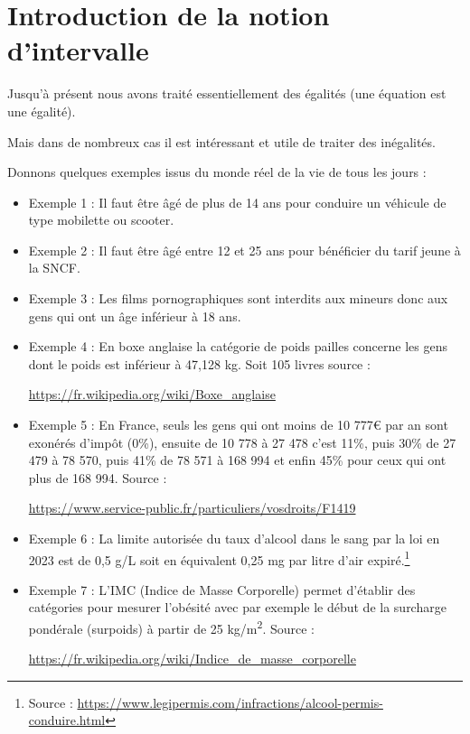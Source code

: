 \documentclass[a4paper,11pt]{book}
\begin{document}
\clearpage

\section{Introduction de la notion d'intervalle}
\label{sec:org36ae53c}
\label{orgac3c6cf}
\label{page:sec2.2.1intro-intervalle}



Jusqu'à présent nous avons traité essentiellement des égalités (une
équation est une égalité).

Mais dans de nombreux cas il est intéressant et utile de traiter des
inégalités.


Donnons quelques exemples issus du monde réel de la vie de tous les
jours :


\begin{itemize}
\item Exemple 1 : Il faut être âgé de plus de 14 ans pour conduire un
véhicule de type mobilette ou scooter.
\item Exemple 2 : Il faut être âgé entre 12 et 25 ans pour bénéficier du
tarif jeune à la SNCF.
\item Exemple 3 : Les films pornographiques sont interdits aux mineurs
donc aux gens qui ont un âge inférieur à 18 ans.
\item Exemple 4 : En boxe anglaise la catégorie de poids pailles concerne
les gens dont le poids est inférieur à 47,128 kg.
Soit 105 livres source :

\url{https://fr.wikipedia.org/wiki/Boxe\_anglaise}
\item Exemple 5 : En France, seuls les gens qui ont moins de 10 777€ par
an sont exonérés d'impôt (0\%), ensuite de 10 778 à 27 478 c'est 11\%,
puis 30\% de 27 479 à 78 570, puis 41\% de 78 571 à 168 994 et enfin
45\% pour ceux qui ont plus de 168 994.
Source :

\url{https://www.service-public.fr/particuliers/vosdroits/F1419}
\item Exemple 6 : La limite autorisée du taux d'alcool dans le sang par la
loi en 2023 est de 0,5 g/L soit en équivalent 0,25 mg par litre
d'air expiré.\footnote{Source :
\url{https://www.legipermis.com/infractions/alcool-permis-conduire.html}}

\item Exemple 7 : L'IMC (Indice de Masse Corporelle) permet d'établir des
catégories pour mesurer l'obésité avec par exemple le début de la
surcharge pondérale (surpoids) à partir de 25 kg/m\textsuperscript{2}.
Source :

\url{https://fr.wikipedia.org/wiki/Indice\_de\_masse\_corporelle}
\end{itemize}
\end{document}

